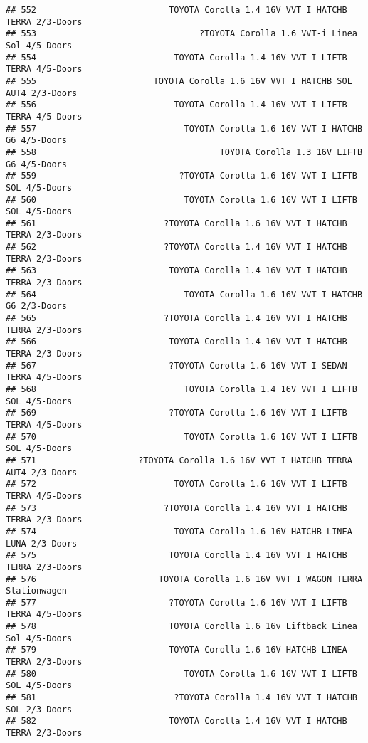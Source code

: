 \documentclass[]{article}
\begin{document}
\begin{verbatim}
## 552                          TOYOTA Corolla 1.4 16V VVT I HATCHB TERRA 2/3-Doors
## 553                                ?TOYOTA Corolla 1.6 VVT-i Linea Sol 4/5-Doors
## 554                           TOYOTA Corolla 1.4 16V VVT I LIFTB TERRA 4/5-Doors
## 555                       TOYOTA Corolla 1.6 16V VVT I HATCHB SOL AUT4 2/3-Doors
## 556                           TOYOTA Corolla 1.4 16V VVT I LIFTB TERRA 4/5-Doors
## 557                             TOYOTA Corolla 1.6 16V VVT I HATCHB G6 4/5-Doors
## 558                                    TOYOTA Corolla 1.3 16V LIFTB G6 4/5-Doors
## 559                            ?TOYOTA Corolla 1.6 16V VVT I LIFTB SOL 4/5-Doors
## 560                             TOYOTA Corolla 1.6 16V VVT I LIFTB SOL 4/5-Doors
## 561                         ?TOYOTA Corolla 1.6 16V VVT I HATCHB TERRA 2/3-Doors
## 562                         ?TOYOTA Corolla 1.4 16V VVT I HATCHB TERRA 2/3-Doors
## 563                          TOYOTA Corolla 1.4 16V VVT I HATCHB TERRA 2/3-Doors
## 564                             TOYOTA Corolla 1.6 16V VVT I HATCHB G6 2/3-Doors
## 565                         ?TOYOTA Corolla 1.4 16V VVT I HATCHB TERRA 2/3-Doors
## 566                          TOYOTA Corolla 1.4 16V VVT I HATCHB TERRA 2/3-Doors
## 567                          ?TOYOTA Corolla 1.6 16V VVT I SEDAN TERRA 4/5-Doors
## 568                             TOYOTA Corolla 1.4 16V VVT I LIFTB SOL 4/5-Doors
## 569                          ?TOYOTA Corolla 1.6 16V VVT I LIFTB TERRA 4/5-Doors
## 570                             TOYOTA Corolla 1.6 16V VVT I LIFTB SOL 4/5-Doors
## 571                    ?TOYOTA Corolla 1.6 16V VVT I HATCHB TERRA AUT4 2/3-Doors
## 572                           TOYOTA Corolla 1.6 16V VVT I LIFTB TERRA 4/5-Doors
## 573                         ?TOYOTA Corolla 1.4 16V VVT I HATCHB TERRA 2/3-Doors
## 574                           TOYOTA Corolla 1.6 16V HATCHB LINEA LUNA 2/3-Doors
## 575                          TOYOTA Corolla 1.4 16V VVT I HATCHB TERRA 2/3-Doors
## 576                        TOYOTA Corolla 1.6 16V VVT I WAGON TERRA Stationwagen
## 577                          ?TOYOTA Corolla 1.6 16V VVT I LIFTB TERRA 4/5-Doors
## 578                          TOYOTA Corolla 1.6 16v Liftback Linea Sol 4/5-Doors
## 579                          TOYOTA Corolla 1.6 16V HATCHB LINEA TERRA 2/3-Doors
## 580                             TOYOTA Corolla 1.6 16V VVT I LIFTB SOL 4/5-Doors
## 581                           ?TOYOTA Corolla 1.4 16V VVT I HATCHB SOL 2/3-Doors
## 582                          TOYOTA Corolla 1.4 16V VVT I HATCHB TERRA 2/3-Doors

\end{verbatim}
\end{document}
